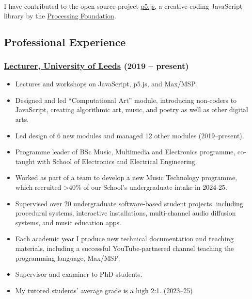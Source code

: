 \documentclass[10pt,a4paper]{article}
\providecommand{\tightlist}{%
  \setlength{\itemsep}{0pt}\setlength{\parskip}{0pt}}
\begin{document}
I have contributed to the open-source project
\href{https://p5js.org/}{p5.js}, a creative-coding JavaScript library by
the \href{https://processingfoundation.org/}{Processing Foundation}.

\subsection{Professional Experience}\label{professional-experience}

\subsubsection{\texorpdfstring{\href{https://ahc.leeds.ac.uk/music/staff/488/dr-oliver-thurley}{Lecturer,
University of Leeds} (2019 --
present)}{Lecturer, University of Leeds (2019 -- present)}}\label{lecturer-university-of-leeds-2019-present}

\begin{itemize}
\tightlist
\item
  Lectures and workshops on JavaScript, p5.js, and Max/MSP.
\item
  Designed and led ``Computational Art'' module, introducing non-coders
  to JavaScript, creating algorithmic art, music, and poetry as well as
  other digital arts.
\item
  Led design of 6 new modules and managed 12 other modules
  (2019--present).
\item
  Programme leader of BSc Music, Multimedia and Electronics programme,
  co-taught with School of Electronics and Electrical Engineering.
\item
  Worked as part of a team to develop a new Music Technology programme,
  which recruited \textgreater40\% of our School's undergraduate intake
  in 2024-25.
\item
  Supervised over 20 undergraduate software-based student projects,
  including procedural systems, interactive installations, multi-channel
  audio diffusion systems, and music education apps.
\item
  Each academic year I produce new technical documentation and teaching
  materials, including a successful YouTube-partnered channel teaching
  the programming language, Max/MSP.
\item
  Supervisor and examiner to PhD students.
\item
  My tutored students' average grade is a high 2:1. (2023--25)
\end{itemize}
\end{document}

